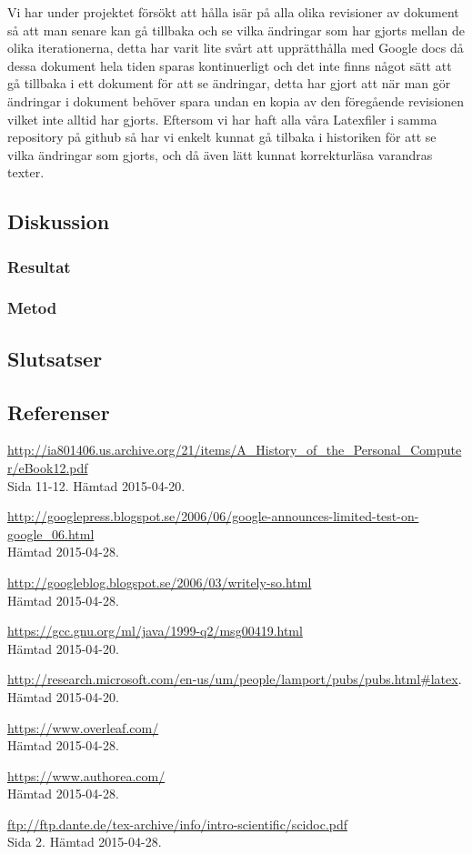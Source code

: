 Vi har under projektet försökt att hålla isär på alla olika revisioner av dokument så att man senare kan gå tillbaka och se vilka ändringar som har gjorts mellan de olika iterationerna, detta har varit lite svårt att upprätthålla med Google docs då dessa dokument hela tiden sparas kontinuerligt och det inte finns något sätt att gå tillbaka i ett dokument för att se ändringar, detta har gjort att när man gör ändringar i dokument behöver spara undan en kopia av den föregående revisionen vilket inte alltid har gjorts. Eftersom vi har haft alla våra Latexfiler i samma repository på github så har vi enkelt kunnat gå tilbaka i historiken för att se vilka ändringar som gjorts, och då även lätt kunnat korrekturläsa varandras texter.
\subsection{Diskussion}
\subsubsection{Resultat}
\subsubsection{Metod}
\subsection{Slutsatser}
\subsection{Referenser}
\begin{thebibliography}{9}
\url{http://ia801406.us.archive.org/21/items/A\_History\_of\_the\_Personal\_Computer/eBook12.pdf}\\
 Sida 11-12. Hämtad 2015-04-20.

\url{http://googlepress.blogspot.se/2006/06/google-announces-limited-test-on-google_06.html}\\
 Hämtad 2015-04-28.

\url{http://googleblog.blogspot.se/2006/03/writely-so.html}\\
 Hämtad 2015-04-28. 

\url{https://gcc.gnu.org/ml/java/1999-q2/msg00419.html}\\
 Hämtad 2015-04-20.

\url{http://research.microsoft.com/en-us/um/people/lamport/pubs/pubs.html#latex}.\\
 Hämtad 2015-04-20.
 
\url{https://www.overleaf.com/}\\
 Hämtad 2015-04-28.

\url{https://www.authorea.com/}\\
 Hämtad 2015-04-28.
 
\url{ftp://ftp.dante.de/tex-archive/info/intro-scientific/scidoc.pdf}\\
Sida 2. Hämtad 2015-04-28.

\end{thebibliography}
